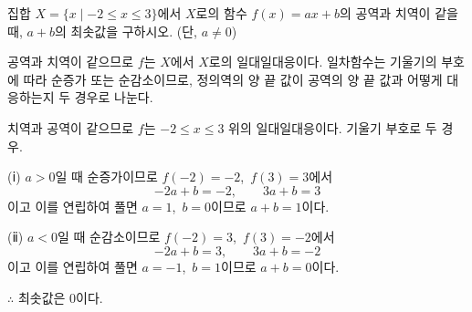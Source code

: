 \documentclass[10pt]{article}
\begin{document}
\begin{dmproblem}
집합 $X = \{ x \mid -2 \le x \le 3 \}$에서 $X$로의 함수 $f(x) = ax + b$의 공역과 치역이 같을 때, $a + b$의 최솟값을 구하시오. (단, $a \ne 0$)
\end{dmproblem}

\begin{dmapproach}
공역과 치역이 같으므로 $f$는 $X$에서 $X$로의 일대일대응이다. 일차함수는 기울기의 부호에 따라 순증가 또는 순감소이므로, 정의역의 양 끝 값이 공역의 양 끝 값과 어떻게 대응하는지 두 경우로 나눈다.
\end{dmapproach}

\begin{dmsolution}
치역과 공역이 같으므로 $f$는 $-2 \le x \le 3$ 위의 일대일대응이다. 기울기 부호로 두 경우.

\vspace{3mm}
(ⅰ) $a > 0$일 때 순증가이므로 $f(-2) = -2$,\ $f(3) = 3$에서
\begin{equation*}
  -2a + b = -2,\qquad 3a + b = 3
\end{equation*}
이고 이를 연립하여 풀면 $a = 1$,\ $b = 0$이므로 $a + b = 1$이다.

\vspace{3mm}
(ⅱ) $a < 0$일 때 순감소이므로 $f(-2) = 3$,\ $f(3) = -2$에서
\begin{equation*}
  -2a + b = 3,\qquad 3a + b = -2
\end{equation*}
이고 이를 연립하여 풀면 $a = -1$,\ $b = 1$이므로 $a + b = 0$이다.

\vspace{3mm}
$\therefore$ 최솟값은 $0$이다.
\end{dmsolution}

\dmchecktitle



\newpage

\dmconcepthead
{}
\end{document}
